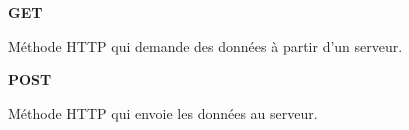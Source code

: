 \vspace{1cm}

\begin{minipage}{\textwidth}
    \begin{minipage}{0.1\textwidth}
        \textbf{GET}
    \end{minipage}\hfill
    \begin{minipage}{0.8\textwidth}
        Méthode HTTP qui demande des données à partir d'un serveur.
    \end{minipage}
\end{minipage}

\vspace{1cm}

\begin{minipage}{\textwidth}
    \begin{minipage}{0.1\textwidth}
        \textbf{POST}
    \end{minipage}\hfill
    \begin{minipage}{0.8\textwidth}
        Méthode HTTP qui envoie les données au serveur.
    \end{minipage}
\end{minipage}
